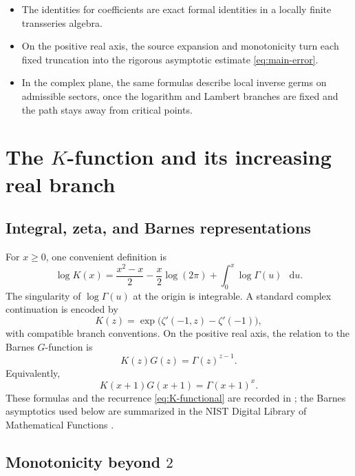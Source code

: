 \documentclass[11pt,oneside]{article}
\theoremstyle{plain}
\theoremstyle{definition}
\theoremstyle{remark}
\newcommand{\dd}{\mathop{}\!\mathrm{d}}
\begin{document}
\begin{itemize}
\item The identities for coefficients are exact formal identities in a
locally finite transseries algebra.
\item On the positive real axis, the source expansion and monotonicity turn
each fixed truncation into the rigorous asymptotic estimate
\cref{eq:main-error}.
\item In the complex plane, the same formulas describe local inverse germs on
admissible sectors, once the logarithm and Lambert branches are fixed and the
path stays away from critical points.
\end{itemize}

\section{The \(K\)-function and its increasing real branch}
\label{sec:K-background}

\subsection{Integral, zeta, and Barnes representations}

For \(x\ge0\), one convenient definition is
\begin{equation}
 \log K(x)
 =\frac{x^2-x}{2}-\frac{x}{2}\log(2\pi)
  +\int_0^x\log\Gamma(u)\,\dd u.
 \label{eq:K-integral}
\end{equation}
The singularity of \(\log\Gamma(u)\) at the origin is integrable.  A standard
complex continuation is encoded by
\begin{equation}
 K(z)=\exp\!\bigl(\zeta'(-1,z)-\zeta'(-1)\bigr),
 \label{eq:K-Hurwitz}
\end{equation}
with compatible branch conventions.  On the positive real axis, the relation
to the Barnes \(G\)-function is
\begin{equation}
 K(z)G(z)=\Gamma(z)^{z-1}.
 \label{eq:K-Barnes-relation}
\end{equation}
Equivalently,
\begin{equation}
 K(x+1)G(x+1)=\Gamma(x+1)^x.
 \label{eq:K-Barnes-shifted}
\end{equation}
These formulas and the recurrence \cref{eq:K-functional} are recorded in
\cite{SondowHadjicostas2007}; the Barnes asymptotics used below are summarized
in the NIST Digital Library of Mathematical Functions
\cite{DLMF}.

\subsection{Monotonicity beyond \(2\)}
\end{document}
